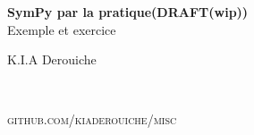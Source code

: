 \documentclass[11pt,fleqn]{book} %
\begin{document}

\begingroup
\thispagestyle{empty}
\centering
\vspace*{5cm}
\par\normalfont\fontsize{35}{35}\sffamily\selectfont
\textbf{SymPy par la pratique(DRAFT(wip))}\\
{\LARGE Exemple et exercice}\par %
\vspace*{1cm}
{\Huge K.I.A Derouiche}\par %
\endgroup


\newpage
~\vfill
\thispagestyle{empty}

\noindent \textsc{github.com/kiaderouiche/misc}\\ %




\pagestyle{empty} %

\tableofcontents %


\pagestyle{fancy} %





\end{document}
